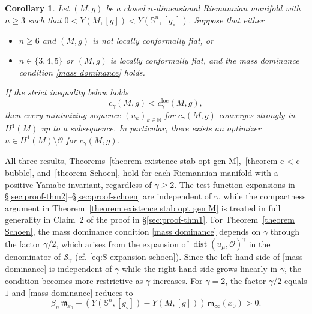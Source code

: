 \documentclass[reqno,11pt]{amsart}
\numberwithin{equation}{section}
\newtheorem{corollary}[theorem]{Corollary}
\theoremstyle{definition}
\theoremstyle{remark}
\DeclareMathOperator{\dist}{dist}
\newcommand{\Ss}{\mathbb{S}}
\begin{document}
\begin{corollary}
\label{corollary existence stab opt gen M}
Let $(M,g)$ be a closed $n$-dimensional Riemannian manifold with $n\geqslant 3$ such 
that $0 < Y(M,[g]) < Y(\Ss^n,[g_\circ])$. Suppose that either
\begin{itemize}
\item[(i)] $n \geqslant 6$ and $(M,g)$ is not locally conformally flat, or
\item[(ii)] $n \in \{3,4,5\}$ or $(M,g)$ is locally conformally flat, and the mass dominance condition \eqref{mass dominance} holds.
\end{itemize}
If the strict inequality below holds
\begin{equation}
\label{strict ineq cor}
c_{\gamma}(M,g) < c_{\gamma}^{\mathrm{loc}}(M,g),
\end{equation}
then every minimizing sequence $(u_k)_{k \in \mathbb{N}}$ for $c_{\gamma}(M,g)$ 
converges strongly in $H^1(M)$ up to a subsequence. In particular,
there exists an optimizer $u \in H^1(M) \setminus \mathscr{O}$ for $c_{\gamma}(M,g)$.
\end{corollary}

All three results, Theorems~\ref{theorem existence stab opt gen M},~\ref{theorem c < c-bubble}, 
and~\ref{theorem Schoen}, hold for each Riemannian manifold with a positive Yamabe 
invariant, regardless of $\gamma \geqslant 2$. The test function expansions 
in \S\ref{sec:proof-thm2}--\S\ref{sec:proof-schoen} are independent of $\gamma$, while the 
compactness argument in Theorem~\ref{theorem existence stab opt gen M} is treated in full 
generality in Claim~2 of the proof in \S\ref{sec:proof-thm1}. For Theorem~\ref{theorem Schoen}, 
the mass dominance condition \eqref{mass dominance} depends on $\gamma$ through the factor 
$\gamma/2$, which arises from the expansion of $\dist(u_\mu, \mathscr{O})^\gamma$ in the 
denominator of $\mathcal{S}_\gamma$ (cf. \eqref{eq:S-expansion-schoen}). Since the 
left-hand side of \eqref{mass dominance} is independent of $\gamma$ while the right-hand 
side grows linearly in $\gamma$, the condition becomes more restrictive as $\gamma$ increases. 
For $\gamma = 2$, the factor $\gamma/2$ equals $1$ and \eqref{mass dominance} reduces to
\[
\beta_n\, \mathfrak{m}_{x_0}- (Y(\Ss^n,[g_\circ]) - Y(M,[g]))\,\mathsf{m}_\infty(x_0)> 0.
\]
\end{document}
